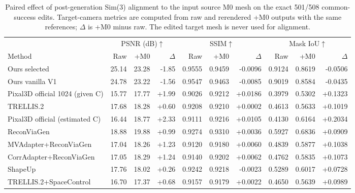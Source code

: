 \begin{table}[t]
\centering\scriptsize
\begin{tabular}{lrrrrrrrrr}
\toprule
& \multicolumn{3}{c}{PSNR (dB)$\uparrow$} & \multicolumn{3}{c}{SSIM$\uparrow$} & \multicolumn{3}{c}{Mask IoU$\uparrow$}\\
Method & Raw & +M0 & $\Delta$ & Raw & +M0 & $\Delta$ & Raw & +M0 & $\Delta$\\
\midrule
Ours selected & 25.14 & 23.28 & -1.85 & 0.9555 & 0.9459 & -0.0096 & 0.9124 & 0.8619 & -0.0506\\
Ours vanilla V1 & 24.78 & 23.22 & -1.56 & 0.9547 & 0.9463 & -0.0085 & 0.9019 & 0.8584 & -0.0435\\
Pixal3D official 1024 (given C) & 15.77 & 17.77 & +1.99 & 0.9026 & 0.9212 & +0.0186 & 0.3979 & 0.5302 & +0.1323\\
TRELLIS.2 & 17.68 & 18.28 & +0.60 & 0.9208 & 0.9210 & +0.0002 & 0.4613 & 0.5633 & +0.1019\\
Pixal3D official (estimated C) & 16.44 & 18.77 & +2.33 & 0.9111 & 0.9216 & +0.0105 & 0.4130 & 0.6164 & +0.2034\\
ReconViaGen & 18.88 & 19.88 & +0.99 & 0.9274 & 0.9310 & +0.0036 & 0.5927 & 0.6836 & +0.0909\\
MVAdapter+ReconViaGen & 17.04 & 18.26 & +1.23 & 0.9120 & 0.9180 & +0.0060 & 0.4839 & 0.5877 & +0.1038\\
CorrAdapter+ReconViaGen & 17.05 & 18.29 & +1.24 & 0.9140 & 0.9202 & +0.0062 & 0.4762 & 0.5835 & +0.1073\\
ShapeUp & 17.76 & 18.02 & +0.26 & 0.9242 & 0.9218 & -0.0023 & 0.5289 & 0.6017 & +0.0728\\
TRELLIS.2+SpaceControl & 16.70 & 17.37 & +0.68 & 0.9157 & 0.9179 & +0.0022 & 0.4650 & 0.5639 & +0.0989\\
\bottomrule
\end{tabular}
\caption{Paired effect of post-generation Sim(3) alignment to the input source M0 mesh on the exact 501/508 common-success edits. Target-camera metrics are computed from raw and rerendered +M0 outputs with the same references; $\Delta$ is +M0 minus raw. The edited target mesh is never used for alignment.}
\label{tab:target8-source-m0-effect}
\end{table}
